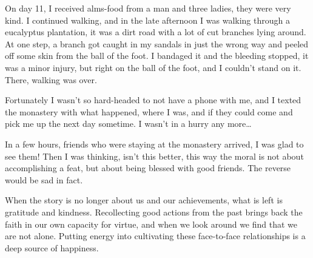 On day 11, I received alms-food from a man and three ladies, they were
very kind. I continued walking, and in the late afternoon I was walking
through a eucalyptus plantation, it was a dirt road with a lot of cut
branches lying around. At one step, a branch got caught in my sandals in
just the wrong way and peeled off some skin from the ball of the foot. I
bandaged it and the bleeding stopped, it was a minor injury, but right
on the ball of the foot, and I couldn't stand on it. There, walking was
over.

Fortunately I wasn't so hard-headed to not have a phone with me, and I
texted the monastery with what happened, where I was, and if they could
come and pick me up the next day sometime. I wasn't in a hurry any
more\ldots{}

In a few hours, friends who were staying at the monastery arrived, I was
glad to see them! Then I was thinking, isn't this better, this way the
moral is not about accomplishing a feat, but about being blessed with
good friends. The reverse would be sad in fact.

When the story is no longer about us and our achievements, what is left
is gratitude and kindness. Recollecting good actions from the past
brings back the faith in our own capacity for virtue, and when we look
around we find that we are not alone. Putting energy into cultivating
these face-to-face relationships is a deep source of happiness.
